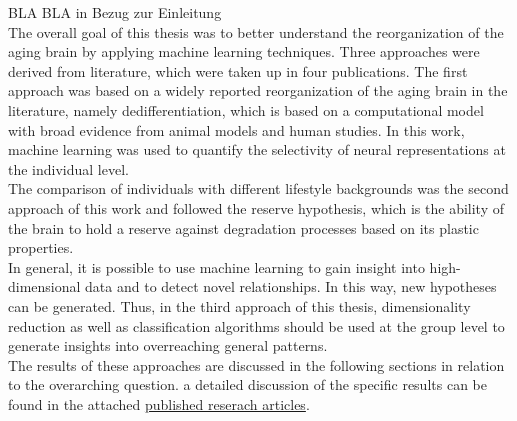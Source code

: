 BLA BLA in Bezug zur Einleitung\\
The overall goal of this thesis was to better understand the reorganization of the aging brain by applying machine learning techniques. Three approaches were derived from literature, which were taken up in four publications.
The first approach was based on a widely reported reorganization of the aging brain in the literature, namely dedifferentiation, which is based on a computational model with broad evidence from animal models and human studies. In this work, machine learning was used to quantify the selectivity of neural representations at the individual level.\\
The comparison of individuals with different lifestyle backgrounds was the second approach of this work and followed the reserve hypothesis, which is the ability of the brain to hold a reserve against degradation processes based on its plastic properties.\\
In general, it is possible to use machine learning to gain insight into high-dimensional data and to detect novel relationships. In this way, new hypotheses can be generated. Thus, in the third approach of this thesis, dimensionality reduction as well as classification algorithms should be used at the group level to generate insights into overreaching general patterns.\\
The results of these approaches are discussed in the following sections in relation to the overarching question. a detailed discussion of the specific results can be found in the attached \hyperref[pub:papers]{published reserach articles}.

